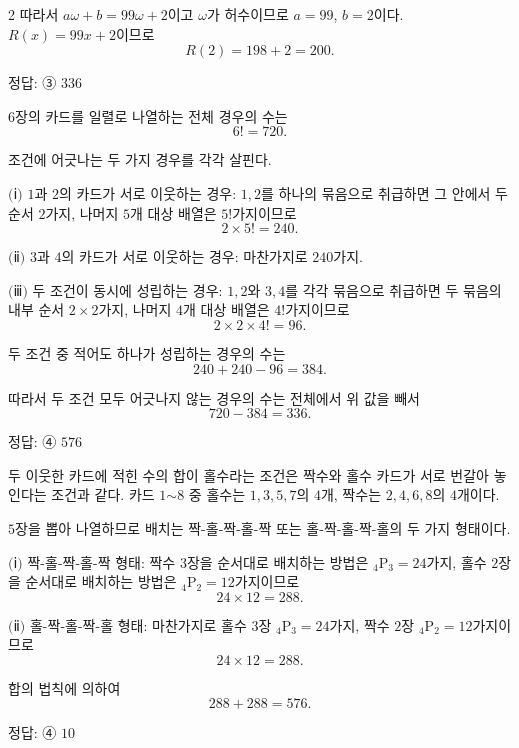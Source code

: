 \documentclass[10pt]{article}
\begin{document}
\begin{multicols}{2}
따라서 $a\omega + b = 99\omega + 2$이고 $\omega$가 허수이므로 $a = 99$, $b = 2$이다. $R(x) = 99x + 2$이므로
\[ R(2) = 198 + 2 = 200. \]

\begin{answerbox}정답: ③ $336$\end{answerbox}

$6$장의 카드를 일렬로 나열하는 전체 경우의 수는
\[ 6! = 720. \]

조건에 어긋나는 두 가지 경우를 각각 살핀다.

$(\!$ⅰ$)$ $1$과 $2$의 카드가 서로 이웃하는 경우: $1, 2$를 하나의 묶음으로 취급하면 그 안에서 두 순서 $2$가지, 나머지 $5$개 대상 배열은 $5!$가지이므로
\[ 2 \times 5! = 240. \]

$(\!$ⅱ$)$ $3$과 $4$의 카드가 서로 이웃하는 경우: 마찬가지로 $240$가지.

$(\!$ⅲ$)$ 두 조건이 동시에 성립하는 경우: $1, 2$와 $3, 4$를 각각 묶음으로 취급하면 두 묶음의 내부 순서 $2 \times 2$가지, 나머지 $4$개 대상 배열은 $4!$가지이므로
\[ 2 \times 2 \times 4! = 96. \]

두 조건 중 적어도 하나가 성립하는 경우의 수는
\[ 240 + 240 - 96 = 384. \]

따라서 두 조건 모두 어긋나지 않는 경우의 수는 전체에서 위 값을 빼서
\[ 720 - 384 = 336. \]

\begin{answerbox}정답: ④ $576$\end{answerbox}

두 이웃한 카드에 적힌 수의 합이 홀수라는 조건은 짝수와 홀수 카드가 서로 번갈아 놓인다는 조건과 같다. 카드 $1$$\sim$$8$ 중 홀수는 $1, 3, 5, 7$의 $4$개, 짝수는 $2, 4, 6, 8$의 $4$개이다.

$5$장을 뽑아 나열하므로 배치는 짝-홀-짝-홀-짝 또는 홀-짝-홀-짝-홀의 두 가지 형태이다.

$(\!$ⅰ$)$ 짝-홀-짝-홀-짝 형태: 짝수 $3$장을 순서대로 배치하는 방법은 ${}_4\mathrm{P}_3 = 24$가지, 홀수 $2$장을 순서대로 배치하는 방법은 ${}_4\mathrm{P}_2 = 12$가지이므로
\[ 24 \times 12 = 288. \]

$(\!$ⅱ$)$ 홀-짝-홀-짝-홀 형태: 마찬가지로 홀수 $3$장 ${}_4\mathrm{P}_3 = 24$가지, 짝수 $2$장 ${}_4\mathrm{P}_2 = 12$가지이므로
\[ 24 \times 12 = 288. \]

합의 법칙에 의하여
\[ 288 + 288 = 576. \]

\begin{answerbox}정답: ④ $10$\end{answerbox}


\end{multicols}
\end{document}
